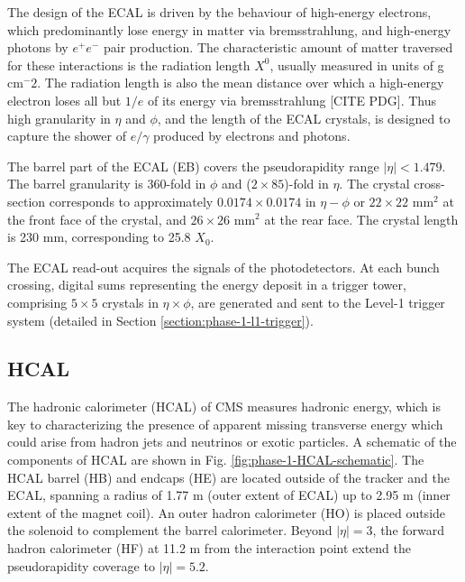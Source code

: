 The design of the ECAL is driven by the behaviour of high-energy electrons, which predominantly lose energy in matter via bremsstrahlung, and high-energy photons by $e^+ e^-$ pair production. The characteristic amount of matter traversed for these interactions is the radiation length $X^0$, usually measured in units of g cm$^-2$. The radiation length is also the mean distance over which a high-energy electron loses all but $1/e$ of its energy via bremsstrahlung [CITE PDG]. Thus high granularity in $\eta$ and $\phi$, and the length of the ECAL crystals, is designed to capture the shower of $e/\gamma$ produced by electrons and photons.

The barrel part of the ECAL (EB) covers the pseudorapidity range $|\eta| < 1.479$. The barrel granularity is 360-fold in $\phi$ and ($2 \times 85$)-fold in $\eta$. The crystal cross-section corresponds to approximately $0.0174 \times 0.0174$ in $\eta-\phi$ or $22 \times 22$ mm$^2$ at the front face of the crystal, and $26 \times 26$ mm$^2$ at the rear face. The crystal length is 230 mm, corresponding to 25.8 $X_0$.

The ECAL read-out acquires the signals of the photodetectors. At each bunch crossing, digital sums representing the energy deposit in a trigger tower, comprising $5 \times 5$ crystals in $\eta \times \phi$, are generated and sent to the Level-1 trigger system (detailed in Section \ref{section:phase-1-l1-trigger}).

\subsection{HCAL}
The hadronic calorimeter (HCAL) of CMS measures hadronic energy, which is key to characterizing the presence of apparent missing transverse energy which could arise from hadron jets and neutrinos or exotic particles. A schematic of the components of HCAL are shown in Fig. \ref{fig:phase-1-HCAL-schematic}. The HCAL barrel (HB) and endcaps (HE) are located outside of the tracker and the ECAL, spanning a radius of 1.77 m (outer extent of ECAL) up to 2.95 m (inner extent of the magnet coil). An outer hadron calorimeter (HO) is placed outside the solenoid to complement the barrel calorimeter. Beyond $|\eta| = 3$, the forward hadron calorimeter (HF) at 11.2 m from the interaction point extend the pseudorapidity coverage to $|\eta| = 5.2$.

